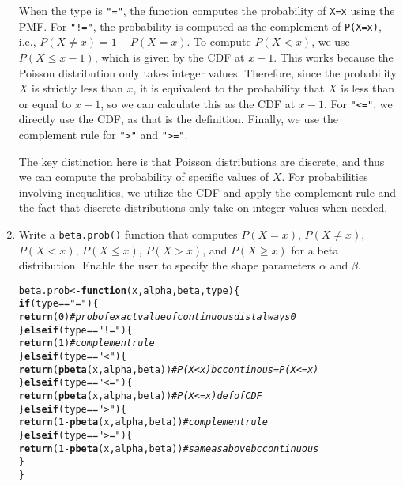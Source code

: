 \documentclass{article}\usepackage[]{graphicx}\usepackage[]{xcolor}
\makeatletter
\newcommand{\hlnum}[1]{\textcolor[rgb]{0.686,0.059,0.569}{#1}}%
\newcommand{\hlsng}[1]{\textcolor[rgb]{0.192,0.494,0.8}{#1}}%
\newcommand{\hlcom}[1]{\textcolor[rgb]{0.678,0.584,0.686}{\textit{#1}}}%
\newcommand{\hlopt}[1]{\textcolor[rgb]{0,0,0}{#1}}%
\newcommand{\hldef}[1]{\textcolor[rgb]{0.345,0.345,0.345}{#1}}%
\newcommand{\hlkwa}[1]{\textcolor[rgb]{0.161,0.373,0.58}{\textbf{#1}}}%
\newcommand{\hlkwb}[1]{\textcolor[rgb]{0.69,0.353,0.396}{#1}}%
\newcommand{\hlkwc}[1]{\textcolor[rgb]{0.333,0.667,0.333}{#1}}%
\newcommand{\hlkwd}[1]{\textcolor[rgb]{0.737,0.353,0.396}{\textbf{#1}}}%
\newenvironment{kframe}{%
 \def\at@end@of@kframe{}%
 \ifinner\ifhmode%
  \def\at@end@of@kframe{\end{minipage}}%
  \begin{minipage}{\columnwidth}%
 \fi\fi%
 \def\FrameCommand##1{\hskip\@totalleftmargin \hskip-\fboxsep
 \colorbox{shadecolor}{##1}\hskip-\fboxsep
     \hskip-\linewidth \hskip-\@totalleftmargin \hskip\columnwidth}%
 \MakeFramed {\advance\hsize-\width
   \@totalleftmargin\z@ \linewidth\hsize
   \@setminipage}}%
 {\par\unskip\endMakeFramed%
 \at@end@of@kframe}
\newenvironment{knitrout}{}{} %
\makeatother
\begin{document}
\begin{enumerate}
When the type is \texttt{"="}, the function computes the probability of
\texttt{X=x} using the PMF. For \texttt{"!="}, the probability is computed as 
the complement of \texttt{P(X=x)}, i.e., $P (X \neq x) = 1 - P(X=x)$. To compute
$P(X < x)$, we use $P(X \leq x-1)$, which is given by the CDF at $x-1$.
This works because the Poisson distribution only takes integer values. Therefore, since
the probability $X$ is strictly less than $x$, it is equivalent to the probability
that $X$ is less than or equal to $x-1$, so we can calculate this as the CDF
at $x-1$. For \texttt{"<="}, we directly use the CDF, as that is the definition.
Finally, we use the complement rule for \texttt{">"} and \texttt{">="}.


The key distinction here is that Poisson distributions are discrete, and thus
we can compute the probability of specific values of $X$. For probabilities 
involving inequalities, we utilize the CDF and apply the complement rule and the
fact that discrete distributions only take on integer values when needed.

    \item Write a \texttt{beta.prob()} function that computes $P(X=x)$, 
    $P(X \neq x)$, $P(X<x)$, $P(X \leq x)$, $P(X > x)$, and $P(X \geq x)$
    for a beta distribution. Enable the user to specify the shape parameters
    $\alpha$ and $\beta$.
\begin{knitrout}\scriptsize
{}\color{fgcolor}\begin{kframe}
\begin{alltt}
\hldef{beta.prob} \hlkwb{<-} \hlkwa{function}\hldef{(}\hlkwc{x}\hldef{,} \hlkwc{alpha}\hldef{,} \hlkwc{beta}\hldef{,} \hlkwc{type}\hldef{)\{}
  \hlkwa{if} \hldef{(type} \hlopt{==} \hlsng{"="}\hldef{)\{}
    \hlkwd{return}\hldef{(}\hlnum{0}\hldef{)}                 \hlcom{# prob of exact value of continuous dist always 0}
  \hldef{\}} \hlkwa{else if} \hldef{(type}\hlopt{==} \hlsng{"!="}\hldef{) \{}
    \hlkwd{return}\hldef{(}\hlnum{1}\hldef{)}                 \hlcom{# complement rule}
  \hldef{\}} \hlkwa{else if} \hldef{(type}\hlopt{==} \hlsng{"<"}\hldef{)\{}
    \hlkwd{return}\hldef{(}\hlkwd{pbeta}\hldef{(x, alpha, beta))} \hlcom{# P(X<x) bc continous = P(X<=x)}
  \hldef{\}} \hlkwa{else if} \hldef{(type} \hlopt{==} \hlsng{"<="}\hldef{) \{}
    \hlkwd{return}\hldef{(}\hlkwd{pbeta}\hldef{(x, alpha, beta))} \hlcom{# P(X<=x) def of CDF}
  \hldef{\}} \hlkwa{else if} \hldef{(type} \hlopt{==} \hlsng{">"}\hldef{) \{}
    \hlkwd{return}\hldef{(}\hlnum{1} \hlopt{-} \hlkwd{pbeta}\hldef{(x, alpha, beta))} \hlcom{# complement rule}
  \hldef{\}} \hlkwa{else if} \hldef{(type} \hlopt{==} \hlsng{">="}\hldef{)\{}
    \hlkwd{return}\hldef{(}\hlnum{1} \hlopt{-} \hlkwd{pbeta}\hldef{(x, alpha, beta))} \hlcom{# same as above bc continuous}
  \hldef{\}}
\hldef{\}}
\end{alltt}
\end{kframe}
\end{knitrout}


\end{enumerate}
\end{document}
